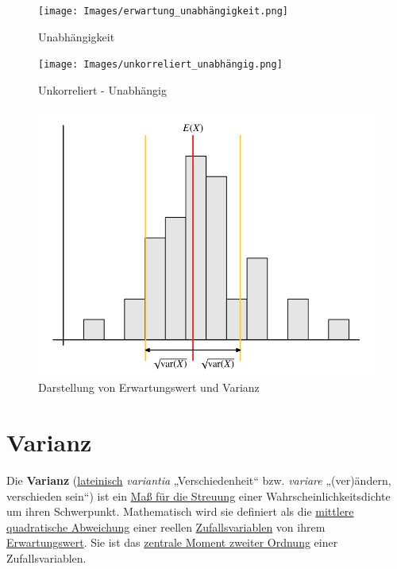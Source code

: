 \documentclass[../Main.tex]{subfiles}
\begin{document}
\begin{figure}
    \centering
    \texttt{[image: Images/erwartung\_unabhängigkeit.png]}
    \caption{Unabhängigkeit}
    \label{fig:Erwartungswert-Unabhängigkeit}
\end{figure}
\begin{figure}
    \centering
    \texttt{[image: Images/unkorreliert\_unabhängig.png]}
    \caption{Unkorreliert - Unabhängig}
    \label{fig:unkorreliert-unabhängig}
\end{figure}


\begin{figure}[H]
    \centering
    \includegraphics[width=1\linewidth]{Images/erwartungswert-varianz.png}
    \caption{Darstellung von Erwartungswert und Varianz}
    \label{fig:enter-label}
\end{figure}
\newpage
\section{Varianz}
Die \textbf{Varianz} (\href{https://de.wikipedia.org/wiki/Latein}{lateinisch} \textit{variantia} „Verschiedenheit“ bzw. \textit{variare} „(ver)ändern, verschieden sein“) ist ein \href{https://de.wikipedia.org/wiki/Streuungsma\%C3\%9F_(Statistik)}{Maß für die Streuung} einer Wahrscheinlichkeitsdichte um ihren Schwerpunkt. Mathematisch wird sie definiert als die \href{https://de.wikipedia.org/wiki/Mittlere_quadratische_Abweichung}{mittlere quadratische Abweichung} einer reellen \href{https://de.wikipedia.org/wiki/Zufallsvariable}{Zufallsvariablen} von ihrem \href{https://de.wikipedia.org/wiki/Erwartungswert}{Erwartungswert}. Sie ist das \href{https://de.wikipedia.org/wiki/Moment_(Stochastik)\#Zentrale_Momente}{zentrale Moment zweiter Ordnung} einer Zufallsvariablen. 
\end{document}
